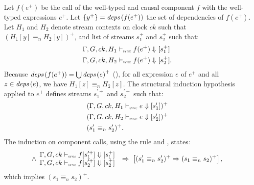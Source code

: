 \begin{skippableproof}
    Let $f(e^+)$ be the call of the well-typed and causal component $f$ with the well-typed
    expressions $e^+$. Let $\{y^+\} = \deps{f(e^+)}$ the set of dependencies of $f(e^+)$. Let $H_1$
    and $H_2$ denote stream contexts on clock $ck$ such that $(H_1[y] \equiv_n H_2[y])^+$, and list
    of streams $s_1^+$ and $s_2^+$ such that:
    \begin{align*}
         & \exprDenot{H_1}{ck}{f(e^+)}{s_1^+}  \\
         & \exprDenot{H_2}{ck}{f(e^+)}{s_2^+}.
    \end{align*}
    Because $\deps{f(e^+)} = \bigcup \deps{e}^+$ (), for all expression $e$ of $e^+$ and all $z \in \deps{e}$, we have
    $H_1[z] \equiv_n H_2[z]$. The structural induction hypothesis applied to $e^+$ defines streams
    $s^{\prime+}_1$ and $s^{\prime+}_2$ such that:
    \begin{align*}
         & (\exprDenot{H_1}{ck}{e}{s'_1})^+ \\
         & (\exprDenot{H_2}{ck}{e}{s'_2})^+ \\
         & (s'_1 \equiv_n s'_2)^+.
    \end{align*}
    The induction on component calls, using the rule  and
    , states:
    $$
        \wedge \begin{array}{l}
            \compDenot{ck}{f}{s_1^{\prime+}}{s_{1}^+} \\
            \compDenot{ck}{f}{s_2^{\prime+}}{s_{2}^+}
        \end{array}
        \; \Rightarrow \;
        \left[(s'_1 \equiv_n s'_2)^+ \Rightarrow (s_1 \equiv_n s_2)^+\right],
    $$
    which implies $(s_1 \equiv_n s_2)^+$.

    \setcounter{paragraph}{0}
\end{skippableproof}

